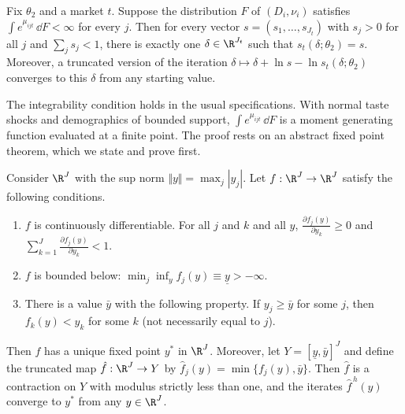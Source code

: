 \begin{theorem}\label{thm:08-berry94}
Fix $\theta_2$ and a market $t$. Suppose the distribution $F$ of $(D_i, \nu_i)$ satisfies
$\int e^{\mu_{ijt}}\, \dd F < \infty$ for every $j$. Then for every vector $s = (s_1, \dots, s_{J_t})$ with
$s_j > 0$ for all $j$ and $\sum_j s_j < 1$, there is exactly one $\delta \in \R^{J_t}$ such that
$s_t(\delta;\theta_2) = s$. Moreover, a truncated version of the iteration $\delta \mapsto \delta + \ln s -
\ln s_t(\delta;\theta_2)$ converges to this $\delta$ from any starting value.
\end{theorem}

The integrability condition holds in the usual specifications. With normal taste shocks and demographics
of bounded support, $\int e^{\mu_{ijt}}\, \dd F$ is a moment generating function evaluated at a finite point.
The proof rests on an abstract fixed point theorem, which we state and prove first.

\begin{theorem}\label{thm:08-contraction}
Consider $\R^{J}$ with the sup norm $\Vert y \Vert = \max_j |y_j|$. Let $f: \R^J \to \R^J$ satisfy the
following conditions.
\begin{enumerate}[label=(\arabic*)]
  \item $f$ is continuously differentiable. For all $j$ and $k$ and all $y$, $\frac{\partial f_j(y)}{\partial
  y_k} \geq 0$ and $\sum_{k=1}^{J}\frac{\partial f_j(y)}{\partial y_k} < 1$.
  \item $f$ is bounded below: $\min_j \inf_y f_j(y) \equiv \underline{y} > -\infty$.
  \item There is a value $\bar y$ with the following property. If $y_j \geq \bar y$ for some $j$, then
  $f_k(y) < y_k$ for some $k$ (not necessarily equal to $j$).
\end{enumerate}
Then $f$ has a unique fixed point $y^*$ in $\R^J$. Moreover, let $Y = [\underline y, \bar y]^J$ and define the
truncated map $\hat f: \R^J \to Y$ by $\hat f_j(y) = \min\{f_j(y), \bar y\}$. Then $\hat f$ is a contraction on
$Y$ with modulus strictly less than one, and the iterates $\hat f^{\,h}(y)$ converge to $y^*$ from any
$y \in \R^J$.
\end{theorem}

